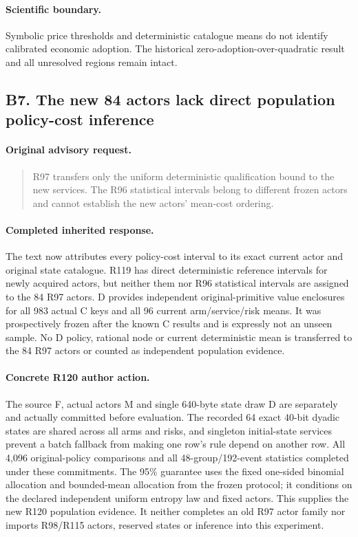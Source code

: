 \paragraph{Scientific boundary.}
Symbolic price thresholds and deterministic catalogue means do not identify calibrated economic adoption. The historical zero-adoption-over-quadratic result and all unresolved regions remain intact.

\subsection{B7. The new 84 actors lack direct population policy-cost inference}
\label{response120:B7}
\paragraph{Original advisory request.}
\begin{quote}
R97 transfers only the uniform deterministic qualification bound to the new services. The R96 statistical intervals belong to different frozen actors and cannot establish the new actors' mean-cost ordering.
\end{quote}
\paragraph{Completed inherited response.}
The text now attributes every policy-cost interval to its exact current actor and original state catalogue. R119 has direct deterministic reference intervals for newly acquired actors, but neither them nor R96 statistical intervals are assigned to the 84 R97 actors. D provides independent original-primitive value enclosures for all 983 actual C keys and all 96 current arm/service/risk means. It was prospectively frozen after the known C results and is expressly not an unseen sample. No D policy, rational node or current deterministic mean is transferred to the 84 R97 actors or counted as independent population evidence.
\paragraph{Concrete R120 author action.}
The source F, actual actors M and single 640-byte state draw D are separately and actually committed before evaluation. The recorded 64 exact 40-bit dyadic states are shared across all arms and risks, and singleton initial-state services prevent a batch fallback from making one row's rule depend on another row. All 4,096 original-policy comparisons and all 48-group/192-event statistics completed under these commitments. The 95\% guarantee uses the fixed one-sided binomial allocation and bounded-mean allocation from the frozen protocol; it conditions on the declared independent uniform entropy law and fixed actors. This supplies the new R120 population evidence. It neither completes an old R97 actor family nor imports R98/R115 actors, reserved states or inference into this experiment.

